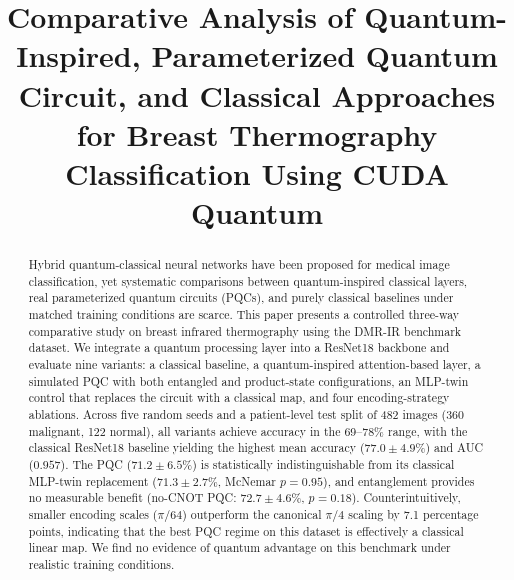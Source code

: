 \documentclass[conference]{IEEEtran}
\begin{document}
\title{Comparative Analysis of Quantum-Inspired, Parameterized Quantum Circuit, and Classical Approaches for Breast Thermography Classification Using CUDA Quantum}

\author{
\and
{}
\and
{}
}

\maketitle

\begin{abstract}
Hybrid quantum-classical neural networks have been proposed for medical image classification, yet systematic comparisons between quantum-inspired classical layers, real parameterized quantum circuits (PQCs), and purely classical baselines under matched training conditions are scarce. This paper presents a controlled three-way comparative study on breast infrared thermography using the DMR-IR benchmark dataset. We integrate a quantum processing layer into a ResNet18 backbone and evaluate nine variants: a classical baseline, a quantum-inspired attention-based layer, a simulated PQC with both entangled and product-state configurations, an MLP-twin control that replaces the circuit with a classical map, and four encoding-strategy ablations. Across five random seeds and a patient-level test split of 482 images (360 malignant, 122 normal), all variants achieve accuracy in the 69--78\% range, with the classical ResNet18 baseline yielding the highest mean accuracy ($77.0 \pm 4.9\%$) and AUC ($0.957$). The PQC ($71.2 \pm 6.5\%$) is statistically indistinguishable from its classical MLP-twin replacement ($71.3 \pm 2.7\%$, McNemar $p = 0.95$), and entanglement provides no measurable benefit (no-CNOT PQC: $72.7 \pm 4.6\%$, $p = 0.18$). Counterintuitively, smaller encoding scales ($\pi/64$) outperform the canonical $\pi/4$ scaling by 7.1 percentage points, indicating that the best PQC regime on this dataset is effectively a classical linear map. We find no evidence of quantum advantage on this benchmark under realistic training conditions.
\end{abstract}
\end{document}
